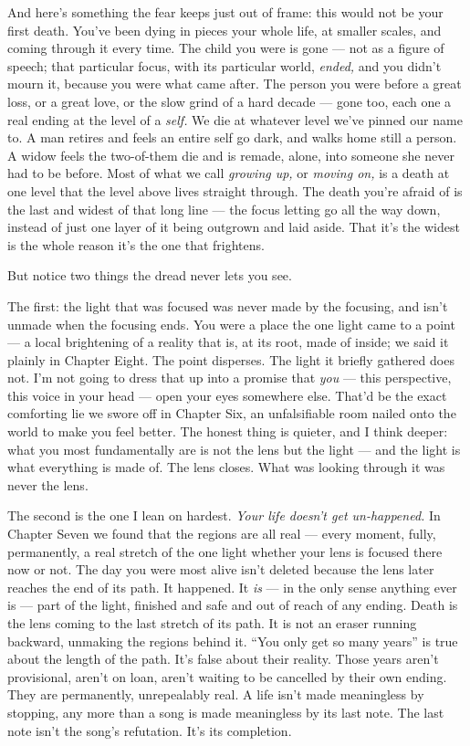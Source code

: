 \documentclass[11pt,openany]{book}
\begin{document}
And here’s something the fear keeps just out of frame: this would not be your first death. You’ve been dying in pieces your whole life, at smaller scales, and coming through it every time. The child you were is gone — not as a figure of speech; that particular focus, with its particular world, \textit{ended,} and you didn’t mourn it, because you were what came after. The person you were before a great loss, or a great love, or the slow grind of a hard decade — gone too, each one a real ending at the level of a \textit{self.} We die at whatever level we’ve pinned our name to. A man retires and feels an entire self go dark, and walks home still a person. A widow feels the two-of-them die and is remade, alone, into someone she never had to be before. Most of what we call \textit{growing up,} or \textit{moving on,} is a death at one level that the level above lives straight through. The death you’re afraid of is the last and widest of that long line — the focus letting go all the way down, instead of just one layer of it being outgrown and laid aside. That it’s the widest is the whole reason it’s the one that frightens.

But notice two things the dread never lets you see.

The first: the light that was focused was never made by the focusing, and isn’t unmade when the focusing ends. You were a place the one light came to a point — a local brightening of a reality that is, at its root, made of inside; we said it plainly in Chapter Eight. The point disperses. The light it briefly gathered does not. I’m not going to dress that up into a promise that \textit{you} — this perspective, this voice in your head — open your eyes somewhere else. That’d be the exact comforting lie we swore off in Chapter Six, an unfalsifiable room nailed onto the world to make you feel better. The honest thing is quieter, and I think deeper: what you most fundamentally are is not the lens but the light — and the light is what everything is made of. The lens closes. What was looking through it was never the lens.

The second is the one I lean on hardest. \textit{Your life doesn’t get un-happened.} In Chapter Seven we found that the regions are all real — every moment, fully, permanently, a real stretch of the one light whether your lens is focused there now or not. The day you were most alive isn’t deleted because the lens later reaches the end of its path. It happened. It \textit{is} — in the only sense anything ever is — part of the light, finished and safe and out of reach of any ending. Death is the lens coming to the last stretch of its path. It is not an eraser running backward, unmaking the regions behind it. “You only get so many years” is true about the length of the path. It’s false about their reality. Those years aren’t provisional, aren’t on loan, aren’t waiting to be cancelled by their own ending. They are permanently, unrepealably real. A life isn’t made meaningless by stopping, any more than a song is made meaningless by its last note. The last note isn’t the song’s refutation. It’s its completion.
\end{document}

